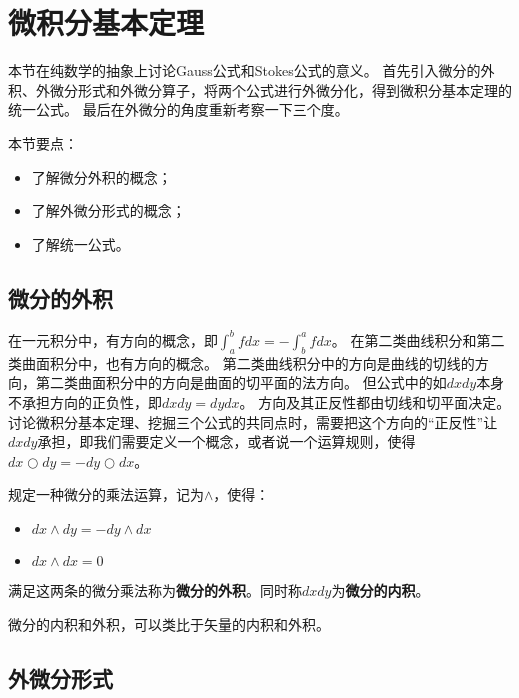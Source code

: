 \section{微积分基本定理}

本节在纯数学的抽象上讨论Gauss公式和Stokes公式的意义。
首先引入微分的外积、外微分形式和外微分算子，将两个公式进行外微分化，得到微积分基本定理的统一公式。
最后在外微分的角度重新考察一下三个度。

本节要点：
\begin{itemize}
    \item 了解微分外积的概念；
    \item 了解外微分形式的概念；
    \item 了解统一公式。
\end{itemize}

\subsection{微分的外积}

在一元积分中，有方向的概念，即$\int_a^b{fdx}=-\int_b^a{fdx}$。
在第二类曲线积分和第二类曲面积分中，也有方向的概念。
第二类曲线积分中的方向是曲线的切线的方向，第二类曲面积分中的方向是曲面的切平面的法方向。
但公式中的如$dxdy$本身不承担方向的正负性，即$dxdy=dydx$。
方向及其正反性都由切线和切平面决定。
讨论微积分基本定理、挖掘三个公式的共同点时，需要把这个方向的“正反性”让$dxdy$承担，即我们需要定义一个概念，或者说一个运算规则，使得$dx\bigcirc dy=-dy\bigcirc dx$。

\begin{definition}[微分外积]
规定一种微分的乘法运算，记为$\land $，使得：
\begin{itemize}
    \item $dx\land dy=-dy\land dx$
    \item $dx\land dx=0$
\end{itemize}
满足这两条的微分乘法称为{\bf 微分的外积}。同时称$dxdy$为{\bf 微分的内积}。
\end{definition}

\begin{tcolorbox}
微分的内积和外积，可以类比于矢量的内积和外积。
\end{tcolorbox}

\subsection{外微分形式}

